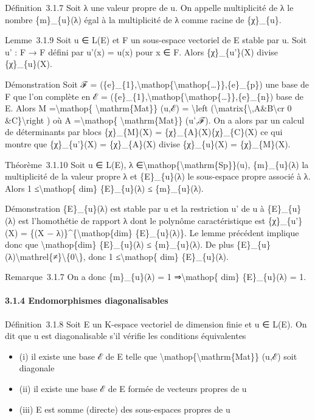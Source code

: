\documentclass[]{article}
\begin{document}
Définition~3.1.7 Soit λ une valeur propre de u. On appelle multiplicité
de λ le nombre \{m\}\_\{u\}(λ) égal à la multiplicité de λ comme racine
de \{χ\}\_\{u\}.

Lemme~3.1.9 Soit u ∈ L(E) et F un sous-espace vectoriel de E stable par
u. Soit u' : F → F défini par u'(x) = u(x) pour x ∈ F. Alors
\{χ\}\_\{u'\}(X) divise \{χ\}\_\{u\}(X).

Démonstration Soit ℱ =
(\{e\}\_\{1\},\textbackslash{}mathop\{\textbackslash{}mathop\{\ldots{}\}\},\{e\}\_\{p\})
une base de F que l'on complète en ℰ =
(\{e\}\_\{1\},\textbackslash{}mathop\{\textbackslash{}mathop\{\ldots{}\}\},\{e\}\_\{n\})
base de E. Alors M =\textbackslash{}mathop\{
\textbackslash{}mathrm\{Mat\}\} (u,ℰ) = \textbackslash{}left
(\textbackslash{}matrix\{\textbackslash{},A\&B\textbackslash{}cr 0
\&C\}\textbackslash{}right ) où A =\textbackslash{}mathop\{
\textbackslash{}mathrm\{Mat\}\} (u',ℱ). On a alors par un calcul de
déterminants par blocs \{χ\}\_\{M\}(X) = \{χ\}\_\{A\}(X)\{χ\}\_\{C\}(X)
ce qui montre que \{χ\}\_\{u'\}(X) = \{χ\}\_\{A\}(X) divise
\{χ\}\_\{u\}(X) = \{χ\}\_\{M\}(X).

Théorème~3.1.10 Soit u ∈ L(E), λ
∈\textbackslash{}mathop\{\textbackslash{}mathrm\{Sp\}\}(u),
\{m\}\_\{u\}(λ) la multiplicité de la valeur propre λ et \{E\}\_\{u\}(λ)
le sous-espace propre associé à λ. Alors 1 ≤\textbackslash{}mathop\{
dim\} \{E\}\_\{u\}(λ) ≤ \{m\}\_\{u\}(λ).

Démonstration \{E\}\_\{u\}(λ) est stable par u et la restriction u' de u
à \{E\}\_\{u\}(λ) est l'homothétie de rapport λ dont le polynôme
caractéristique est \{χ\}\_\{u'\}(X) = \{(X −
λ)\}\^{}\{\textbackslash{}mathop\{dim\} \{E\}\_\{u\}(λ)\}. Le lemme
précédent implique donc que \textbackslash{}mathop\{dim\}
\{E\}\_\{u\}(λ) ≤ \{m\}\_\{u\}(λ). De plus
\{E\}\_\{u\}(λ)\textbackslash{}mathrel\{≠\}\textbackslash{}\{0\textbackslash{}\},
donc 1 ≤\textbackslash{}mathop\{ dim\} \{E\}\_\{u\}(λ).

Remarque~3.1.7 On a donc \{m\}\_\{u\}(λ) = 1 ⇒\textbackslash{}mathop\{
dim\} \{E\}\_\{u\}(λ) = 1.

\paragraph{3.1.4 Endomorphismes diagonalisables}

Définition~3.1.8 Soit E un K-espace vectoriel de dimension finie et u ∈
L(E). On dit que u est diagonalisable s'il vérifie les conditions
équivalentes

\begin{itemize}
\itemsep1pt\parskip0pt
\item
  (i) il existe une base ℰ de E telle que
  \textbackslash{}mathop\{\textbackslash{}mathrm\{Mat\}\} (u,ℰ) soit
  diagonale
\item
  (ii) il existe une base ℰ de E formée de vecteurs propres de u
\item
  (iii) E est somme (directe) des sous-espaces propres de u
\end{itemize}
\end{document}
